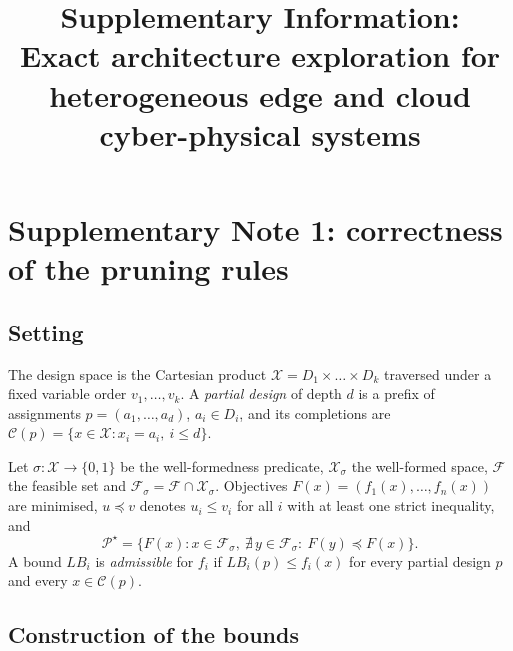 \documentclass[pdflatex,sn-nature]{sn-jnl}
\newcommand{\X}{\mathcal{X}}
\newcommand{\C}{\mathcal{C}}
\newcommand{\F}{\mathcal{F}}
\newcommand{\PS}{\mathcal{P}^{\star}}
\newcommand{\LB}{\mathit{LB}}
\theoremstyle{thmstyleone}
\theoremstyle{thmstyletwo}
\theoremstyle{thmstylethree}
\begin{document}
\title[Supplementary Information]{Supplementary Information:\\
Exact architecture exploration for heterogeneous edge and cloud cyber-physical systems}

\author*[1]{ }
\author[1]{ }


\maketitle

\section{Supplementary Note 1: correctness of the pruning rules}\label{snote1}

\subsection{Setting}
The design space is the Cartesian product $\X=D_1\times\dots\times D_k$ traversed under a
fixed variable order $v_1,\dots,v_k$. A \emph{partial design} of depth $d$ is a prefix of
assignments $p=(a_1,\dots,a_d)$, $a_i\in D_i$, and its completions are
$\C(p)=\{x\in\X: x_i=a_i,\ i\le d\}$.

Let $\sigma:\X\to\{0,1\}$ be the well-formedness predicate, $\X_\sigma$ the well-formed
space, $\F$ the feasible set and $\F_\sigma=\F\cap\X_\sigma$. Objectives
$F(x)=(f_1(x),\dots,f_n(x))$ are minimised, $u\preceq v$ denotes $u_i\le v_i$ for all $i$
with at least one strict inequality, and
\begin{equation}
\PS=\{F(x): x\in\F_\sigma,\ \nexists\,y\in\F_\sigma:\ F(y)\preceq F(x)\}.
\end{equation}
A bound $\LB_i$ is \emph{admissible} for $f_i$ if $\LB_i(p)\le f_i(x)$ for every partial
design $p$ and every $x\in\C(p)$.

\subsection{Construction of the bounds}
\end{document}
